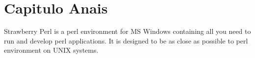 \section{Capitulo Anais}
Strawberry Perl is a perl environment for MS Windows containing all you need to run and develop perl applications. It is designed to be as close as possible to perl environment on UNIX systems.